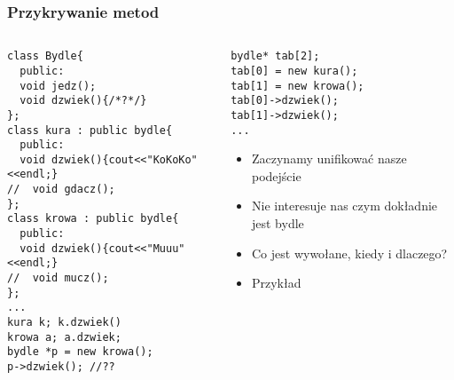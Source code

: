 \documentclass[10pt]{beamer}
\begin{document}
\begin{frame}[fragile]
  \frametitle{Przykrywanie metod}
  \begin{columns}
    \begin{column}{0.49\textwidth}
      \begin{lstlisting}
class Bydle{
  public:
  void jedz();
  void dzwiek(){/*?*/}
};
class kura : public bydle{
  public:
  void dzwiek(){cout<<"KoKoKo"<<endl;}
//  void gdacz();
};
class krowa : public bydle{
  public:
  void dzwiek(){cout<<"Muuu"<<endl;}
//  void mucz();
};
...
kura k; k.dzwiek()
krowa a; a.dzwiek;
bydle *p = new krowa();
p->dzwiek(); //??
\end{lstlisting}
    \end{column}
    \begin{column}{0.49\textwidth}
\begin{lstlisting}
bydle* tab[2];
tab[0] = new kura();
tab[1] = new krowa();
tab[0]->dzwiek();
tab[1]->dzwiek();
...
\end{lstlisting}
    \begin{itemize}
  \item Zaczynamy unifikować nasze podejście
  \item Nie interesuje nas czym dokładnie jest bydle
  \item Co jest wywołane, kiedy i dlaczego?
  \item Przykład
\end{itemize}
    \end{column}
  \end{columns}
\end{frame}
\end{document}
